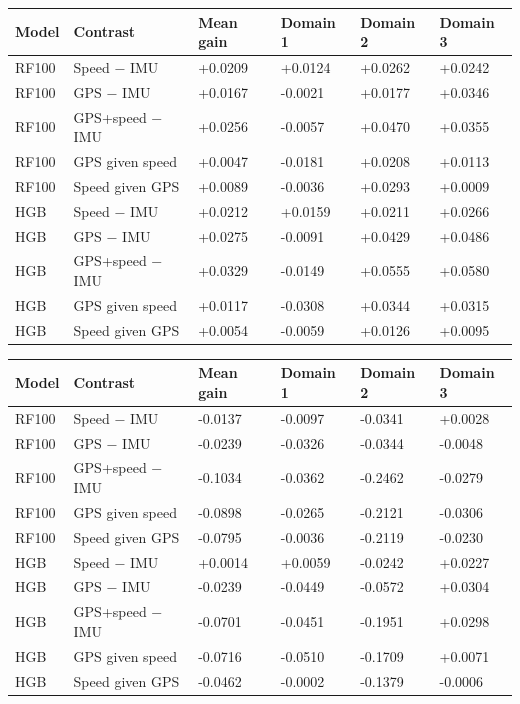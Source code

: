 \begin{singlespace}\small
\noindent\begin{minipage}{\linewidth}
\centering
{}
\begin{tabularx}{\linewidth}{XYYYYY}
\toprule
Model & Contrast & Mean gain & Domain 1 & Domain 2 & Domain 3 \\
\midrule
RF100 & Speed − IMU & +0.0209 & +0.0124 & +0.0262 & +0.0242 \\
RF100 & GPS − IMU & +0.0167 & -0.0021 & +0.0177 & +0.0346 \\
RF100 & GPS+speed − IMU & +0.0256 & -0.0057 & +0.0470 & +0.0355 \\
RF100 & GPS given speed & +0.0047 & -0.0181 & +0.0208 & +0.0113 \\
RF100 & Speed given GPS & +0.0089 & -0.0036 & +0.0293 & +0.0009 \\
HGB & Speed − IMU & +0.0212 & +0.0159 & +0.0211 & +0.0266 \\
HGB & GPS − IMU & +0.0275 & -0.0091 & +0.0429 & +0.0486 \\
HGB & GPS+speed − IMU & +0.0329 & -0.0149 & +0.0555 & +0.0580 \\
HGB & GPS given speed & +0.0117 & -0.0308 & +0.0344 & +0.0315 \\
HGB & Speed given GPS & +0.0054 & -0.0059 & +0.0126 & +0.0095 \\
\bottomrule
\end{tabularx}
\end{minipage}
\end{singlespace}
\par\medskip
\par\medskip
\begin{singlespace}\small
\noindent\begin{minipage}{\linewidth}
\centering
{}
\begin{tabularx}{\linewidth}{XYYYYY}
\toprule
Model & Contrast & Mean gain & Domain 1 & Domain 2 & Domain 3 \\
\midrule
RF100 & Speed − IMU & -0.0137 & -0.0097 & -0.0341 & +0.0028 \\
RF100 & GPS − IMU & -0.0239 & -0.0326 & -0.0344 & -0.0048 \\
RF100 & GPS+speed − IMU & -0.1034 & -0.0362 & -0.2462 & -0.0279 \\
RF100 & GPS given speed & -0.0898 & -0.0265 & -0.2121 & -0.0306 \\
RF100 & Speed given GPS & -0.0795 & -0.0036 & -0.2119 & -0.0230 \\
HGB & Speed − IMU & +0.0014 & +0.0059 & -0.0242 & +0.0227 \\
HGB & GPS − IMU & -0.0239 & -0.0449 & -0.0572 & +0.0304 \\
HGB & GPS+speed − IMU & -0.0701 & -0.0451 & -0.1951 & +0.0298 \\
HGB & GPS given speed & -0.0716 & -0.0510 & -0.1709 & +0.0071 \\
HGB & Speed given GPS & -0.0462 & -0.0002 & -0.1379 & -0.0006 \\
\bottomrule
\end{tabularx}
\end{minipage}
\end{singlespace}
